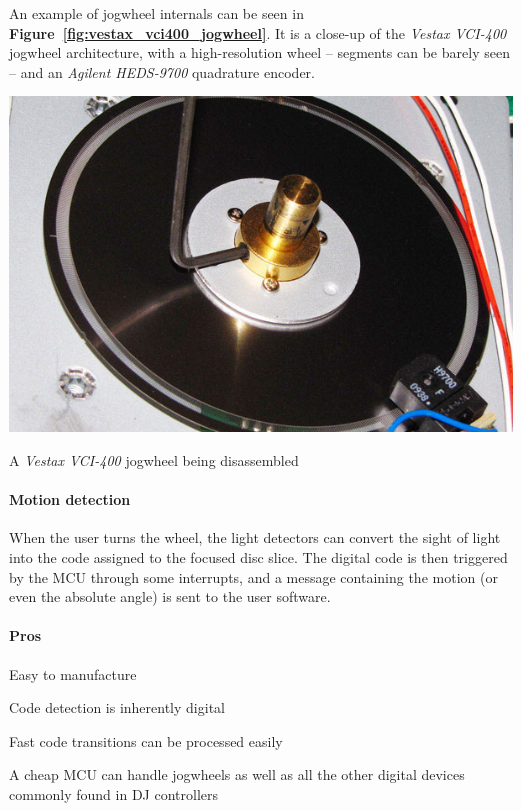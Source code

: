 \documentclass[a4paper,10pt]{article}
\makeatletter
\newenvironment{figurehere}{\def\@captype{figure}\vspace{2ex}}{\vspace{2ex}}
\newcommand{\citef}[1]{\textbf{Figure~\ref{#1}}}
\makeatother
\begin{document}
\begin{multicols}{2}
An example of jogwheel internals can be seen in \citef{fig:vestax_vci400_jogwheel}.
It is a close-up of the \emph{Vestax VCI-400} \cite{vestax_vci400} jogwheel
architecture, with a high-resolution wheel -- segments can be barely seen --
and an \emph{Agilent HEDS-9700} quadrature encoder.

\begin{figurehere}
	\centering
	\includegraphics[keepaspectratio=true,width=0.8\columnwidth]{images/vestax_vci400_jogwheel.jpg}
	\caption{A \emph{Vestax VCI-400} jogwheel being disassembled}
	\label{fig:vestax_vci400_jogwheel}
\end{figurehere}


\paragraph{Motion detection}
When the user turns the wheel, the light detectors can convert the sight of
light into the code assigned to the focused disc slice. The digital code is
then triggered by the MCU through some interrupts, and a message containing
the motion (or even the absolute angle) is sent to the user software.


\paragraph{Pros}
\begin{itemize*}
	\item Easy to manufacture
	\item Code detection is inherently digital
	\item Fast code transitions can be processed easily
	\item A cheap MCU can handle jogwheels as well as all the other digital
		devices commonly found in DJ controllers
\end{itemize*}



\end{multicols}
\end{document}
